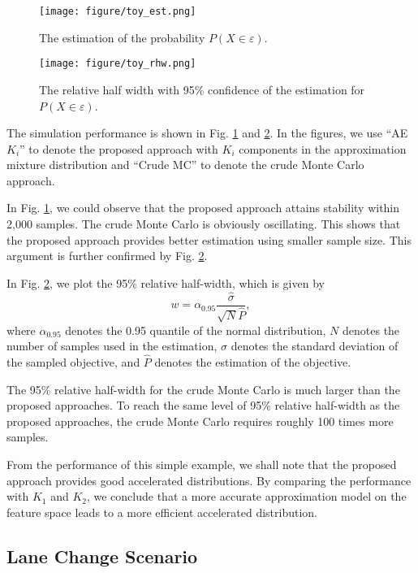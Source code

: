 \documentclass[letterpaper, 10 pt, journal]{IEEEtran}  %
\begin{document}
\begin{figure}[t]
	\centering
	\texttt{[image: figure/toy\_est.png]}
	\caption{The estimation of the probability $P(X \in \varepsilon)$.}
	\label{fig:toy_est}
\end{figure}

\begin{figure}[t]
	\centering
	\texttt{[image: figure/toy\_rhw.png]}
	\caption{The relative half width with 95\% confidence of the estimation for $P(X \in \varepsilon)$.}
	\label{fig:toy_rhw}
\end{figure}

The simulation performance is shown in Fig. \ref{fig:toy_est} and \ref{fig:toy_rhw}. In the figures, we use ``AE $K_i$'' to denote the proposed approach with $K_i$ components in the approximation mixture distribution and ``Crude MC'' to denote the crude Monte Carlo approach. 

In Fig. \ref{fig:toy_est}, we could observe that the proposed approach attains stability within 2,000 samples. The crude Monte Carlo is obviously oscillating. This shows that the proposed approach provides better estimation using smaller sample size. This argument is further confirmed by Fig. \ref{fig:toy_rhw}. 

In Fig. \ref{fig:toy_rhw}, we plot the 95\% relative half-width, which is given by\begin{equation}
w=\alpha_{0.95} \frac{\hat{\sigma}}{\sqrt{N}\hat{P}} ,
\end{equation}
where $\alpha_{0.95} $ denotes the 0.95 quantile of the normal distribution, $N$ denotes the number of samples used in the estimation, $\hat{\sigma}$ denotes the standard deviation of the sampled objective, and $\hat{P}$ denotes the estimation of the objective.

The 95\% relative half-width for the crude Monte Carlo is much larger than the proposed approaches. To reach the same level of 95\% relative half-width as the proposed approaches, the crude Monte Carlo requires roughly 100 times more samples.

From the performance of this simple example, we shall note that the proposed approach provides good accelerated distributions. By comparing the performance with $K_1$ and $K_2$, we conclude that a more accurate approximation model on the feature space leads to a more efficient accelerated distribution.

\subsection{Lane Change Scenario}\label{sec:lane_change}
\end{document}

